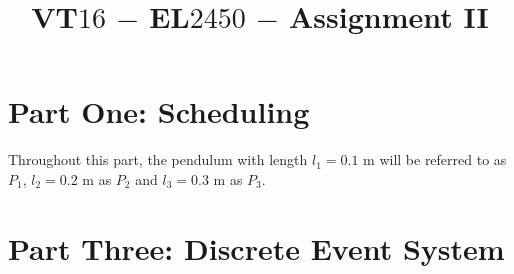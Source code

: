 \documentclass[oneside,12pt]{article}
\title{VT$16$ $-$ EL$2450$ $-$ Assignment II}
\author{
  \noindent\makebox[\textwidth][c]{
    \begin{minipage}{\linewidth}\centering
      \begin{minipage}{0.35\linewidth}\centering
        Alexandros Filotheou \\ 871108-5590 \\ alefil@kth.se
      \end{minipage}
      \begin{minipage}{0.35\linewidth}\centering
        Roberto Sanchez-Rey \\ 840616-9139\\ rosr@kth.se
      \end{minipage}
    \end{minipage}
  }}
\date{}
\begin{document}
	\maketitle

  \section{Part One: Scheduling}
    Throughout this part, the pendulum with length $l_1 = 0.1$ m will be
    referred to as $P_1$, $l_2 = 0.2$ m as $P_2$ and $l_3 = 0.3$ m as $P_3$.




  \section{Part Three: Discrete Event System}
    
    

  \newpage

  \appendix
  
\end{document}
